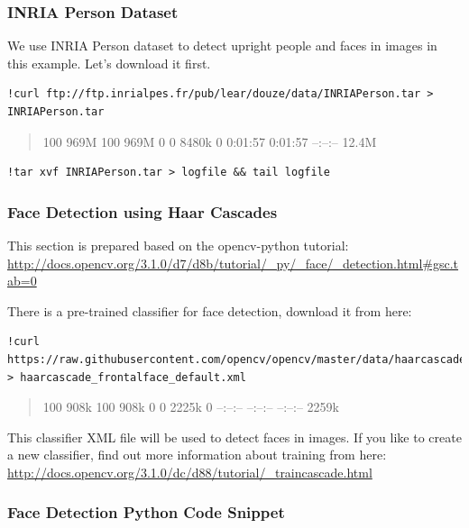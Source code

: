 \subsubsection{INRIA Person Dataset}\label{inria-person-dataset-1}

We use INRIA Person dataset to detect upright people and faces in images
in this example. Let's download it first.

\begin{verbatim}
!curl ftp://ftp.inrialpes.fr/pub/lear/douze/data/INRIAPerson.tar > INRIAPerson.tar
\end{verbatim}

\begin{quote}
100 969M 100 969M 0 0 8480k 0 0:01:57 0:01:57 --:--:-- 12.4M
\end{quote}

\begin{verbatim}
!tar xvf INRIAPerson.tar > logfile && tail logfile
\end{verbatim}

\subsubsection{Face Detection using Haar
Cascades}\label{face-detection-using-haar-cascades}

This section is prepared based on the opencv-python tutorial:
\url{http://docs.opencv.org/3.1.0/d7/d8b/tutorial/_py/_face/_detection.html\#gsc.tab=0}

There is a pre-trained classifier for face detection, download it from
here:

\begin{verbatim}
!curl https://raw.githubusercontent.com/opencv/opencv/master/data/haarcascades/haarcascade_frontalface_default.xml > haarcascade_frontalface_default.xml
\end{verbatim}

\begin{quote}
100 908k 100 908k 0 0 2225k 0 --:--:-- --:--:-- --:--:-- 2259k
\end{quote}

This classifier XML file will be used to detect faces in images. If you
like to create a new classifier, find out more information about
training from here:
\url{http://docs.opencv.org/3.1.0/dc/d88/tutorial/_traincascade.html}

\subsubsection{Face Detection Python Code
Snippet}\label{face-detection-python-code-snippet}

